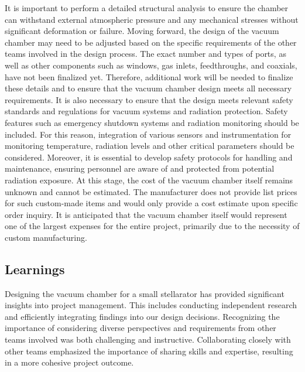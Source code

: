 It is important to perform a detailed structural analysis to ensure the chamber can withstand external atmospheric pressure and any mechanical stresses without significant deformation or failure.
Moving forward, the design of the vacuum chamber may need to be adjusted based on the specific requirements of the other teams involved in the design process.
The exact number and types of ports, as well as other components such as windows, gas inlets, feedthroughs, and coaxials, have not been finalized yet.
Therefore, additional work will be needed to finalize these details and to ensure that the vacuum chamber design meets all necessary requirements.
It is also necessary to ensure that the design meets relevant safety standards and regulations for vacuum systems and radiation protection.
Safety features such as emergency shutdown systems and radiation monitoring should be included.
For this reason, integration of various sensors and instrumentation for monitoring temperature, radiation levels and other critical parameters should be considered.
Moreover, it is essential to develop safety protocols for handling and maintenance, ensuring personnel are aware of and protected from potential radiation exposure.
At this stage, the cost of the vacuum chamber itself remains unknown and cannot be estimated.
The manufacturer does not provide list prices for such custom-made items and would only provide a cost estimate upon specific order inquiry.
It is anticipated that the vacuum chamber itself would represent one of the largest expenses for the entire project, primarily due to the necessity of custom manufacturing.

\subsection{Learnings}

Designing the vacuum chamber for a small stellarator has provided significant insights into project management.
This includes conducting independent research and efficiently integrating findings into our design decisions.
Recognizing the importance of considering diverse perspectives and requirements from other teams involved was both challenging and instructive.
Collaborating closely with other teams emphasized the importance of sharing skills and expertise, resulting in a more cohesive project outcome.
